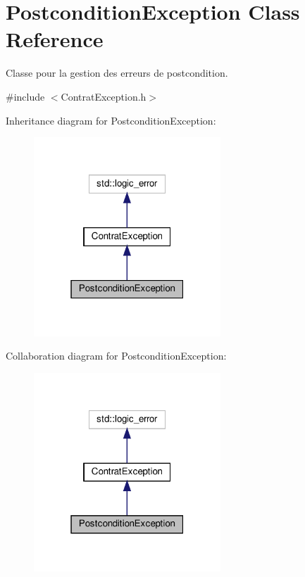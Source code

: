 \hypertarget{classPostconditionException}{}\section{Postcondition\+Exception Class Reference}
\label{classPostconditionException}


Classe pour la gestion des erreurs de postcondition.  




{\ttfamily \#include $<$Contrat\+Exception.\+h$>$}



Inheritance diagram for Postcondition\+Exception\+:\nopagebreak
\begin{figure}[H]
\begin{center}
\leavevmode
\includegraphics[width=199pt]{classPostconditionException__inherit__graph}
\end{center}
\end{figure}


Collaboration diagram for Postcondition\+Exception\+:\nopagebreak
\begin{figure}[H]
\begin{center}
\leavevmode
\includegraphics[width=199pt]{classPostconditionException__coll__graph}
\end{center}
\end{figure}
